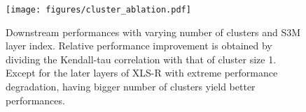 \begin{figure}[t!]
    \centering
    \texttt{[image: figures/cluster\_ablation.pdf]}
    \caption{
        Downstream performances with varying number of clusters and S3M layer index.
        Relative performance improvement is obtained by dividing the Kendall-tau correlation with that of cluster size 1.
        Except for the later layers of XLS-R with extreme performance degradation, having bigger number of clusters yield better performances.
    }
    \label{fig:cluster_abl}
\end{figure}
